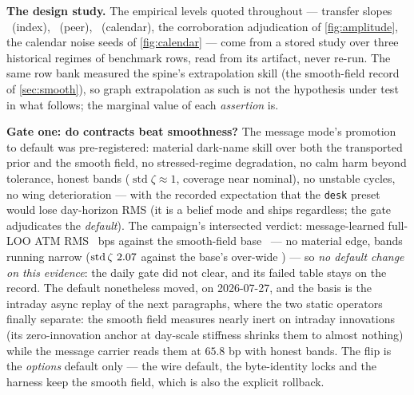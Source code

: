 \documentclass[11pt]{article}
\begin{document}
\textbf{The design study.}  The empirical levels quoted throughout ---
transfer slopes \gtprhoindex\ (index), \gtprhopeer\ (peer),
\gtpcallevel\ (calendar), the corroboration adjudication of
\cref{fig:amplitude}, the calendar noise seeds of \cref{fig:calendar}
--- come from a stored study over three historical regimes of benchmark
rows, read from its artifact, never re-run.  The same row bank measured
the spine's extrapolation skill (the smooth-field record of
\cref{sec:smooth}), so graph extrapolation as such is not the hypothesis
under test in what follows; the marginal value of each \emph{assertion}
is.

\textbf{Gate one: do contracts beat smoothness?}  The message mode's
promotion to default was pre-registered: material dark-name skill over
both the transported prior and the smooth field, no stressed-regime
degradation, no calm harm beyond tolerance, honest bands
($\operatorname{std}\zeta\approx1$, coverage near nominal), no unstable
cycles, no wing deterioration --- with the recorded expectation that the
\texttt{desk} preset would lose day-horizon RMS (it is a belief mode and
ships regardless; the gate adjudicates the \emph{default}).  The
campaign's intersected verdict: message-learned full-LOO ATM RMS
\gtpcampmsg\ bps against the smooth-field base \gtpcampbase\ --- no
material edge, bands running narrow
($\operatorname{std}\zeta\ 2.07$ against the base's over-wide
\gtpzetabase) --- so \emph{no default change on this evidence}: the daily
gate did not clear, and its failed table stays on the record.  The
default nonetheless moved, on 2026-07-27, and the basis is the intraday
async replay of the next paragraphs, where the two static operators
finally separate: the smooth field measures nearly inert on intraday
innovations (its zero-innovation anchor at day-scale stiffness shrinks
them to almost nothing) while the message carrier reads them at
$65.8$ bp with honest bands.  The flip is the \emph{options} default
only --- the wire default, the byte-identity locks and the harness keep
the smooth field, which is also the explicit rollback.
\end{document}
